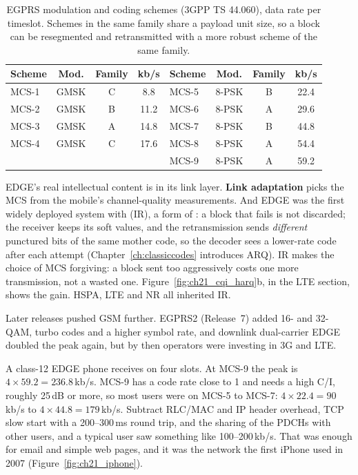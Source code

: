 \begin{table}[htbp]\centering\small
\caption{EGPRS modulation and coding schemes (3GPP TS 44.060), data rate per timeslot.
Schemes in the same family share a payload unit size, so a block can be resegmented and
retransmitted with a more robust scheme of the same family.}
\label{tab:ch21:edge}
\begin{tabular}{@{}l c c c | l c c c@{}}
\toprule
Scheme & Mod. & Family & kb/s & Scheme & Mod. & Family & kb/s\\
\midrule
MCS-1 & GMSK & C & 8.8 & MCS-5 & 8-PSK & B & 22.4\\
MCS-2 & GMSK & B & 11.2 & MCS-6 & 8-PSK & A & 29.6\\
MCS-3 & GMSK & A & 14.8 & MCS-7 & 8-PSK & B & 44.8\\
MCS-4 & GMSK & C & 17.6 & MCS-8 & 8-PSK & A & 54.4\\
 & & & & MCS-9 & 8-PSK & A & 59.2\\
\bottomrule
\end{tabular}
\end{table}

EDGE's real intellectual content is in its link layer. \textbf{Link adaptation}
picks the MCS from the mobile's channel-quality measurements. And EDGE was the first widely deployed
system with  (IR), a form of : a block that fails is
not discarded; the receiver keeps its soft values, and the retransmission sends \emph{different}
punctured bits of the same mother code, so the decoder sees a lower-rate code after each attempt
(Chapter~\ref{ch:classiccodes} introduces ARQ). IR makes the choice of MCS forgiving: a block sent
too aggressively costs one more transmission, not a wasted one. Figure~\ref{fig:ch21_cqi_harq}b, in
the LTE section, shows the gain. HSPA, LTE and NR all inherited IR.

Later releases pushed GSM further. EGPRS2 (Release~7) added 16- and 32-QAM, turbo codes and a higher
symbol rate, and downlink dual-carrier EDGE doubled the peak again, but by then operators were
investing in 3G and LTE.

\begin{worked}
A class-12 EDGE phone receives on four slots. At MCS-9 the peak is $4\times59.2=236.8$\,kb/s. MCS-9
has a code rate close to 1 and needs a high C/I, roughly 25\,dB or more, so most users were on MCS-5
to MCS-7: $4\times22.4=90$\,kb/s to $4\times44.8=179$\,kb/s. Subtract RLC/MAC and IP header
overhead, TCP slow start with a 200--300\,ms round trip, and the sharing of the PDCHs with other
users, and a typical user saw something like 100--200\,kb/s. That was enough for email and simple
web pages, and it was the network the first iPhone used in 2007 (Figure~\ref{fig:ch21_iphone}).
\end{worked}

